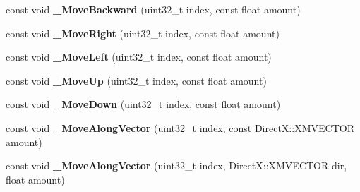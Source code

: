 \begin{DoxyCompactItemize}
\item 
const void {\bfseries \+\_\+\+Move\+Backward} (uint32\+\_\+t index, const float amount)\hypertarget{class_ensum_1_1_components_1_1_transform_manager_a50656a39c711957ab5269e67f3f0c5e9}{}\label{class_ensum_1_1_components_1_1_transform_manager_a50656a39c711957ab5269e67f3f0c5e9}

\item 
const void {\bfseries \+\_\+\+Move\+Right} (uint32\+\_\+t index, const float amount)\hypertarget{class_ensum_1_1_components_1_1_transform_manager_a200e1df71fffc9bf21212a3c92d71cc6}{}\label{class_ensum_1_1_components_1_1_transform_manager_a200e1df71fffc9bf21212a3c92d71cc6}

\item 
const void {\bfseries \+\_\+\+Move\+Left} (uint32\+\_\+t index, const float amount)\hypertarget{class_ensum_1_1_components_1_1_transform_manager_aed03886aff53b5937ff458f4fe8bd135}{}\label{class_ensum_1_1_components_1_1_transform_manager_aed03886aff53b5937ff458f4fe8bd135}

\item 
const void {\bfseries \+\_\+\+Move\+Up} (uint32\+\_\+t index, const float amount)\hypertarget{class_ensum_1_1_components_1_1_transform_manager_aefdabf28a594cfbee912e7c33dc3904f}{}\label{class_ensum_1_1_components_1_1_transform_manager_aefdabf28a594cfbee912e7c33dc3904f}

\item 
const void {\bfseries \+\_\+\+Move\+Down} (uint32\+\_\+t index, const float amount)\hypertarget{class_ensum_1_1_components_1_1_transform_manager_a2eacf57922ea1a0fdba9817e783d11b6}{}\label{class_ensum_1_1_components_1_1_transform_manager_a2eacf57922ea1a0fdba9817e783d11b6}

\item 
const void {\bfseries \+\_\+\+Move\+Along\+Vector} (uint32\+\_\+t index, const Direct\+X\+::\+X\+M\+V\+E\+C\+T\+OR amount)\hypertarget{class_ensum_1_1_components_1_1_transform_manager_ad4ed93621abcdd070336fccffd160333}{}\label{class_ensum_1_1_components_1_1_transform_manager_ad4ed93621abcdd070336fccffd160333}

\item 
const void {\bfseries \+\_\+\+Move\+Along\+Vector} (uint32\+\_\+t index, Direct\+X\+::\+X\+M\+V\+E\+C\+T\+OR dir, float amount)\hypertarget{class_ensum_1_1_components_1_1_transform_manager_aef05093bb6428418b461151150b00c50}{}\label{class_ensum_1_1_components_1_1_transform_manager_aef05093bb6428418b461151150b00c50}


\end{DoxyCompactItemize}
